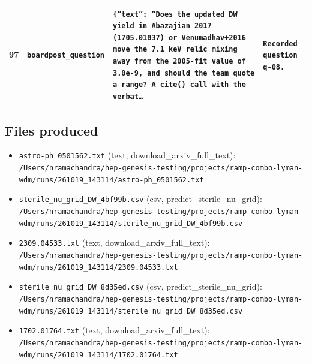 \documentclass[11pt,a4paper]{article}
\begin{document}
\begin{longtable}{@{}p{}p{}p{}p{}@{}}
97 & \texttt{board}\newline\texttt{post\_\allowbreak{}question} & \texttt{\{''text'':\allowbreak{} ''Does the updated DW yield in Abazajian 2017 (1705.01837)\allowbreak{} or Venumadhav+2016 move the 7.1 keV relic mixing away from the 2005-fit value of 3.0e-9,\allowbreak{} and should the team quote a range? A cite()\allowbreak{} call with the verbat\ldots{}\allowbreak{}} & \texttt{Recorded question q-08.} \\
\bottomrule\end{longtable}
\subsection{Files produced}
\begin{itemize}
  \item \texttt{astro-ph\_\allowbreak{}0501562.txt} (text, download\_arxiv\_full\_text): \texttt{/\allowbreak{}Users/\allowbreak{}nramachandra/\allowbreak{}hep-genesis-testing/\allowbreak{}projects/\allowbreak{}ramp-combo-lyman-wdm/\allowbreak{}runs/\allowbreak{}261019\_\allowbreak{}143114/\allowbreak{}astro-ph\_\allowbreak{}0501562.txt}
  \item \texttt{sterile\_\allowbreak{}nu\_\allowbreak{}grid\_\allowbreak{}DW\_\allowbreak{}4bf99b.csv} (csv, predict\_sterile\_nu\_grid): \texttt{/\allowbreak{}Users/\allowbreak{}nramachandra/\allowbreak{}hep-genesis-testing/\allowbreak{}projects/\allowbreak{}ramp-combo-lyman-wdm/\allowbreak{}runs/\allowbreak{}261019\_\allowbreak{}143114/\allowbreak{}sterile\_\allowbreak{}nu\_\allowbreak{}grid\_\allowbreak{}DW\_\allowbreak{}4bf99b.csv}
  \item \texttt{2309.04533.txt} (text, download\_arxiv\_full\_text): \texttt{/\allowbreak{}Users/\allowbreak{}nramachandra/\allowbreak{}hep-genesis-testing/\allowbreak{}projects/\allowbreak{}ramp-combo-lyman-wdm/\allowbreak{}runs/\allowbreak{}261019\_\allowbreak{}143114/\allowbreak{}2309.04533.txt}
  \item \texttt{sterile\_\allowbreak{}nu\_\allowbreak{}grid\_\allowbreak{}DW\_\allowbreak{}8d35ed.csv} (csv, predict\_sterile\_nu\_grid): \texttt{/\allowbreak{}Users/\allowbreak{}nramachandra/\allowbreak{}hep-genesis-testing/\allowbreak{}projects/\allowbreak{}ramp-combo-lyman-wdm/\allowbreak{}runs/\allowbreak{}261019\_\allowbreak{}143114/\allowbreak{}sterile\_\allowbreak{}nu\_\allowbreak{}grid\_\allowbreak{}DW\_\allowbreak{}8d35ed.csv}
  \item \texttt{1702.01764.txt} (text, download\_arxiv\_full\_text): \texttt{/\allowbreak{}Users/\allowbreak{}nramachandra/\allowbreak{}hep-genesis-testing/\allowbreak{}projects/\allowbreak{}ramp-combo-lyman-wdm/\allowbreak{}runs/\allowbreak{}261019\_\allowbreak{}143114/\allowbreak{}1702.01764.txt}

\end{itemize}
\end{document}
